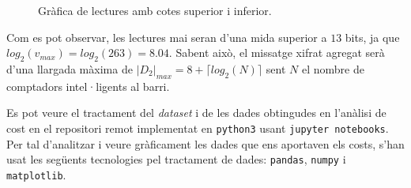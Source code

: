 \begin{itemize}
\begin{figure}[H]
	\caption{Gràfica de lectures amb cotes superior i inferior.}
	\label{fig:consumption2}
\end{figure}
Com es pot observar, les lectures mai seran d'una mida superior a $13$ bits, ja que $log_2(v_{max}) = log_2(263) = 8.04$. Sabent això, el missatge xifrat agregat serà d'una llargada màxima de $|D_2|_{max} = 8 + \lceil log_2(N) \rceil$ sent $N$ el nombre de comptadors intel·ligents al barri.
\end{itemize}
Es pot veure el tractament del \textit{dataset} i de les dades obtingudes en l'anàlisi de cost en el repositori remot \cite{lab-recsi} implementat en \texttt{python3} usant \texttt{jupyter notebooks}. Per tal d'analitzar i veure gràficament les dades que ens aportaven els costs, s'han usat les següents tecnologies pel tractament de dades: \texttt{pandas}, \texttt{numpy} i \texttt{matplotlib}.
